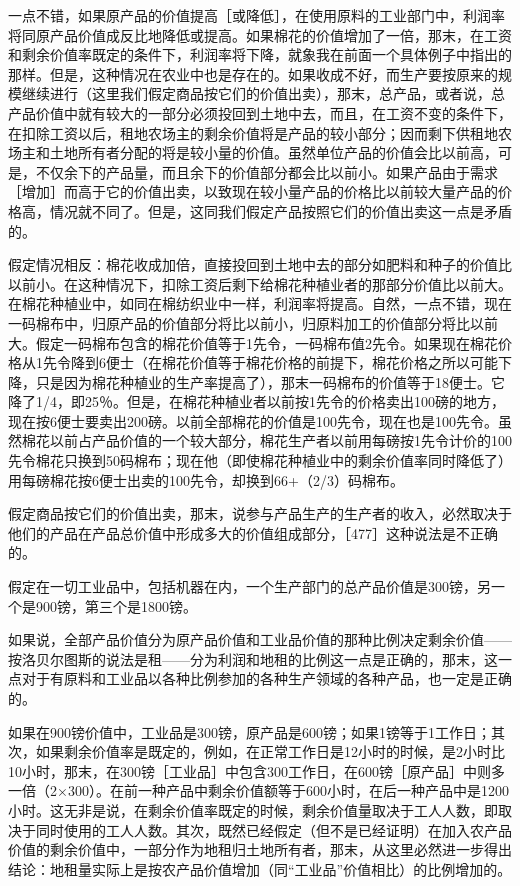 一点不错，如果原产品的价值提高［或降低］，在使用原料的工业部门中，利润率将同原产品价值成反比地降低或提高。如果棉花的价值增加了一倍，那末，在工资和剩余价值率既定的条件下，利润率将下降，就象我在前面一个具体例子中指出的那样。但是，这种情况在农业中也是存在的。如果收成不好，而生产要按原来的规模继续进行（这里我们假定商品按它们的价值出卖），那末，总产品，或者说，总产品价值中就有较大的一部分必须投回到土地中去，而且，在工资不变的条件下，在扣除工资以后，租地农场主的剩余价值将是产品的较小部分；因而剩下供租地农场主和土地所有者分配的将是较小量的价值。虽然单位产品的价值会比以前高，可是，不仅余下的产品量，而且余下的价值部分都会比以前小。如果产品由于需求［增加］而高于它的价值出卖，以致现在较小量产品的价格比以前较大量产品的价格高，情况就不同了。但是，这同我们假定产品按照它们的价值出卖这一点是矛盾的。

假定情况相反：棉花收成加倍，直接投回到土地中去的部分如肥料和种子的价值比以前小。在这种情况下，扣除工资后剩下给棉花种植业者的那部分价值比以前大。在棉花种植业中，如同在棉纺织业中一样，利润率将提高。自然，一点不错，现在一码棉布中，归原产品的价值部分将比以前小，归原料加工的价值部分将比以前大。假定一码棉布包含的棉花价值等于1先令，一码棉布值2先令。如果现在棉花价格从1先令降到6便士（在棉花价值等于棉花价格的前提下，棉花价格之所以可能下降，只是因为棉花种植业的生产率提高了），那末一码棉布的价值等于18便士。它降了1/4，即25％。但是，在棉花种植业者以前按1先令的价格卖出100磅的地方，现在按6便士要卖出200磅。以前全部棉花的价值是100先令，现在也是100先令。虽然棉花以前占产品价值的一个较大部分，棉花生产者以前用每磅按1先令计价的100先令棉花只换到50码棉布；现在他（即使棉花种植业中的剩余价值率同时降低了）用每磅棉花按6便士出卖的100先令，却换到66+（2/3）码棉布。

假定商品按它们的价值出卖，那末，说参与产品生产的生产者的收入，必然取决于他们的产品在产品总价值中形成多大的价值组成部分，［477］这种说法是不正确的。

假定在一切工业品中，包括机器在内，一个生产部门的总产品价值是300镑，另一个是900镑，第三个是1800镑。

如果说，全部产品价值分为原产品价值和工业品价值的那种比例决定剩余价值——按洛贝尔图斯的说法是租——分为利润和地租的比例这一点是正确的，那末，这一点对于有原料和工业品以各种比例参加的各种生产领域的各种产品，也一定是正确的。

如果在900镑价值中，工业品是300镑，原产品是600镑；如果1镑等于1工作日；其次，如果剩余价值率是既定的，例如，在正常工作日是12小时的时候，是2小时比10小时，那末，在300镑［工业品］中包含300工作日，在600镑［原产品］中则多一倍（2×300）。在前一种产品中剩余价值额等于600小时，在后一种产品中是1200小时。这无非是说，在剩余价值率既定的时候，剩余价值量取决于工人人数，即取决于同时使用的工人人数。其次，既然已经假定（但不是已经证明）在加入农产品价值的剩余价值中，一部分作为地租归土地所有者，那末，从这里必然进一步得出结论：地租量实际上是按农产品价值增加（同“工业品”价值相比）的比例增加的。

